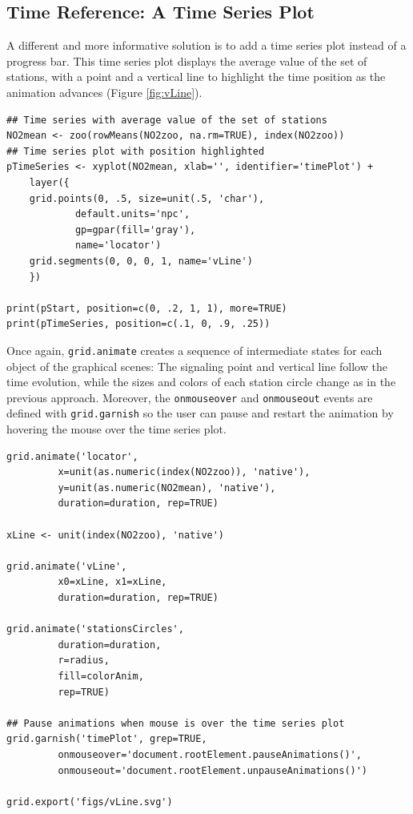 \subsection{Time Reference: A Time Series Plot}
\label{sec-4-4}
A different and more informative solution is to add a time series
plot instead of a progress bar.  This time series plot displays
the average value of the set of stations, with a point and a
vertical line to highlight the time position as the animation
advances (Figure \ref{fig:vLine}).
\lstset{language=R,numbers=none}
\begin{lstlisting}
## Time series with average value of the set of stations
NO2mean <- zoo(rowMeans(NO2zoo, na.rm=TRUE), index(NO2zoo))
## Time series plot with position highlighted
pTimeSeries <- xyplot(NO2mean, xlab='', identifier='timePlot') +
    layer({
	grid.points(0, .5, size=unit(.5, 'char'),
		    default.units='npc',
		    gp=gpar(fill='gray'),
		    name='locator')
	grid.segments(0, 0, 0, 1, name='vLine')
    })

print(pStart, position=c(0, .2, 1, 1), more=TRUE)
print(pTimeSeries, position=c(.1, 0, .9, .25))
\end{lstlisting}


Once again, \texttt{grid.animate} creates a sequence of intermediate states
for each object of the graphical scenes: The signaling point and
vertical line follow the time evolution, while the sizes and colors of
each station circle change as in the previous approach.  Moreover, the
\texttt{onmouseover} and \texttt{onmouseout} events are defined with \texttt{grid.garnish}
so the user can pause and restart the animation by hovering the mouse
over the time series plot.
\lstset{language=R,numbers=none}
\begin{lstlisting}
grid.animate('locator',
	     x=unit(as.numeric(index(NO2zoo)), 'native'),
	     y=unit(as.numeric(NO2mean), 'native'),
	     duration=duration, rep=TRUE)

xLine <- unit(index(NO2zoo), 'native')

grid.animate('vLine',
	     x0=xLine, x1=xLine,
	     duration=duration, rep=TRUE)

grid.animate('stationsCircles',
	     duration=duration,
	     r=radius,
	     fill=colorAnim,
	     rep=TRUE)

## Pause animations when mouse is over the time series plot
grid.garnish('timePlot', grep=TRUE,
	     onmouseover='document.rootElement.pauseAnimations()',
	     onmouseout='document.rootElement.unpauseAnimations()')

grid.export('figs/vLine.svg')
\end{lstlisting}


